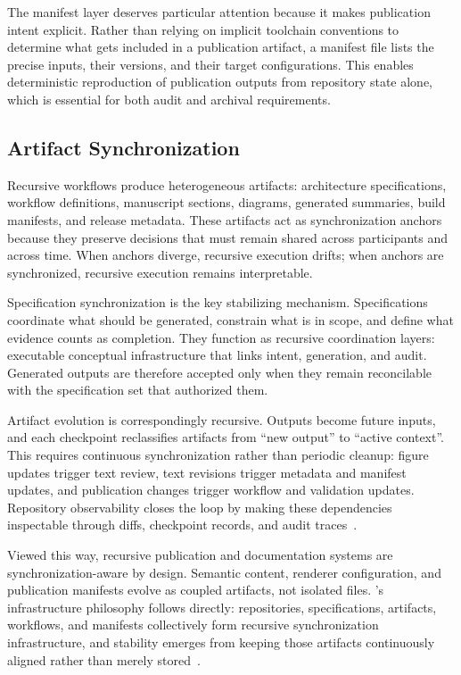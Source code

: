 The manifest layer deserves particular attention because it makes publication intent explicit. Rather than relying on implicit toolchain conventions to determine what gets included in a publication artifact, a manifest file lists the precise inputs, their versions, and their target configurations. This enables deterministic reproduction of publication outputs from repository state alone, which is essential for both audit and archival requirements.

\subsection{Artifact Synchronization}

Recursive workflows produce heterogeneous artifacts: architecture specifications, workflow definitions, manuscript sections, diagrams, generated summaries, build manifests, and release metadata. These artifacts act as synchronization anchors because they preserve decisions that must remain shared across participants and across time. When anchors diverge, recursive execution drifts; when anchors are synchronized, recursive execution remains interpretable.

Specification synchronization is the key stabilizing mechanism. Specifications coordinate what should be generated, constrain what is in scope, and define what evidence counts as completion. They function as recursive coordination layers: executable conceptual infrastructure that links intent, generation, and audit. Generated outputs are therefore accepted only when they remain reconcilable with the specification set that authorized them.

Artifact evolution is correspondingly recursive. Outputs become future inputs, and each checkpoint reclassifies artifacts from ``new output'' to ``active context''. This requires continuous synchronization rather than periodic cleanup: figure updates trigger text review, text revisions trigger metadata and manifest updates, and publication changes trigger workflow and validation updates. Repository observability closes the loop by making these dependencies inspectable through diffs, checkpoint records, and audit traces~\cite{Chandy1985DistributedSnapshots}.

Viewed this way, recursive publication and documentation systems are synchronization-aware by design. Semantic content, renderer configuration, and publication manifests evolve as coupled artifacts, not isolated files. 's infrastructure philosophy follows directly: repositories, specifications, artifacts, workflows, and manifests collectively form recursive synchronization infrastructure, and stability emerges from keeping those artifacts continuously aligned rather than merely stored~\cite{Wiener1948Cybernetics,Beer1972BrainFirm}.


